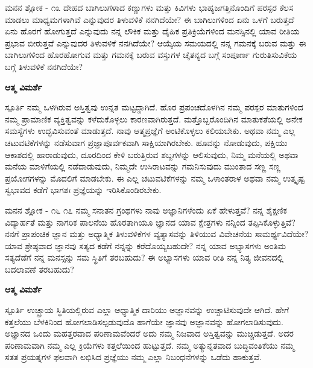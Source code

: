 \newpage
\begin{mananam}{\mananamfont \large ಮನನ ಶ್ಲೋಕ - ೧೩}
\mananamtext ದೇಹದ ಬಾಗಿಲುಗಳಾದ ಕಣ್ಣುಗಳು ಮತ್ತು ಕಿವಿಗಳು  ಭಾಹ್ಯಜಗತ್ತಿನೊಂದಿಗೆ ಪರಸ್ಪರ ಕೆಲಸ ಮಾಡಲು ಮಾಧ್ಯಮಗಳಾಗಿವೆ ಎನ್ನುವುದರ ತಿಳುವಳಿಕೆ  ನನಗಿದೆಯೇ? ಈ ಬಾಗಿಲುಗಳಿಂದ ಏನು ಒಳಗೆ ಬರುತ್ತದೆ ಏನು ಹೊರಗೆ ಹೋಗುತ್ತದೆ ಎನ್ನುವುದು ನನ್ನ ಲೌಕಿಕ ಮತ್ತು ದೈಹಿಕ ಪ್ರತಿಕ್ರಿಯೆಗಳಿಂದ ಮನಸ್ಸಿನಲ್ಲಿ ಯಾವ ರೀತಿಯ ಪ್ರಭಾವ ಬೀರುತ್ತವೆ ಎನ್ನುವುದರ ತಿಳುವಳಿಕೆ ನನಗಿದೆಯೇ? ಆಯ್ಕೆಯ ಸಮಯದಲ್ಲಿ ನನ್ನ ಗಮನಕ್ಕೆ ಬರುವ ಮತ್ತು ಈ ಬಾಗಿಲುಗಳಿಂದ ಹೊರಹೋಗುವ ಮತ್ತು ಗಮನಕ್ಕೆ ಬರುವ ವಸ್ತುಗಳ ಚೈತನ್ಯದ ಬಗ್ಗೆ ಸಂಪೂರ್ಣ ಗುರುತಿಸುವಿಕೆಯ ಬಗ್ಗೆ ತಿಳುವಳಿಕೆ ನನಗಿದೆಯೇ?
\end{mananam}
\WritingHand\enspace\textbf{ಆತ್ಮ ವಿಮರ್ಶೆ}\\
\begin{inspiration}{\mananamfont \large ಸ್ಪೂರ್ತಿ}
\ssmall \mananamtext ನಮ್ಮ ಒಳಗಿರುವ ಅಸ್ತಿತ್ವವು ಉನ್ನತ ಮಟ್ಟದ್ದಾಗಿದೆ. ಹೊರ ಪ್ರಪಂಚದೊಳಗಿನ ನಮ್ಮ ಪರಸ್ಪರ ಮಾತುಗಳಿಂದ ನಮ್ಮ ಪ್ರಾಮಾಣಿಕ ವ್ಯಕ್ತಿತ್ವವನ್ನು ಕಳೆದುಕೊಳ್ಳಲು ಕಾರಣವಾಗಿರುತ್ತದೆ. ಮತ್ತೊಬ್ಬರೊಂದಿಗಿನ ಮಾತುಕತೆಯಲ್ಲಿ ಅನೇಕ ಸಮಸ್ಯೆಗಳು ಉದ್ಭವಿಸುವಂತೆ ಮಾಡುತ್ತದೆ. ನಾವು ಆತ್ಮಪ್ರಜ್ಞೆಗೆ ಅಂಟಿಕೊಳ್ಳಲು ಕಲಿಯಬೇಕು. ಅಥವಾ ನಮ್ಮ ಎಲ್ಲ ಚಟುವಟಿಕೆಗಳನ್ನು ನಡೆಸುವಾಗ ಪ್ರಜ್ಞಾಪೂರ್ವಕವಾಗಿ   ಸಾಕ್ಷಿಯಾಗಿರಬೇಕು. ಹೂವನ್ನು ನೋಡುವುದು, ಪಕ್ಷಿಯು ಆಕಾಶದಲ್ಲಿ ಹಾರಾಡುವುದು, ದೂರದಿಂದ ಕೇಳಿ ಬರುತ್ತಿರುವ ಶಬ್ದಗಳನ್ನು ಆಲಿಸುವುದು, ನಿಮ್ಮ ಮನೆಯಲ್ಲಿ ಅಥವಾ ಮನೆಯ ಮಾಳಿಗೆಯಲ್ಲಿ ನಡೆದಾಡುವುದು, ನಿಮ್ಮದೇ ಉಸಿರಾಟವನ್ನು ಗಮನಿಸುವುದು ಮುಂತಾದ ಸಣ್ಣ ಸಣ್ಣ ಪ್ರಯೋಗಗಳನ್ನು ಮೊದಲಿಗೆ ಮಾಡಬೇಕು. ಈ ಎಲ್ಲ ಚಟುವಟಿಕೆಗಳನ್ನು ನಮ್ಮ ಒಳಾಂತರಾಳ ಅಥವಾ ನಮ್ಮ ಉತ್ಕೃಷ್ಟ ಸ್ವಭಾವದ ಕಡೆಗೆ ಭಾಗಶಃ ಪ್ರಜ್ಞೆಯನ್ನು ಇರಿಸಿಕೊಂಡಿರಬೇಕು.
\end{inspiration}
\newpage

\begin{mananam}{\mananamfont \large ಮನನ ಶ್ಲೋಕ - ೧೬ ೧೭}
\mananamtext ನಮ್ಮ ಸನಾತನ ಗ್ರಂಥಗಳು ನಾವು ಅಜ್ಞಾನಿಗಳೆಂದು ಏಕೆ ಹೇಳುತ್ತವೆ? ನನ್ನ ಶೈಕ್ಷಣಿಕ ವಿದ್ಯಾರ್ಹತೆ ಮತ್ತು ನಾಗರಿಕ ಪಾಲನೆಯ ಹೊರತಾಗಿಯೂ ಜ್ಞಾನದ ಯಾವ ಕ್ಷೇತ್ರಗಳು ನನ್ನಿಂದ ತಪ್ಪಿಸಿಕೊಳ್ಳುತ್ತಿವೆ? ನನಗೆ ಪ್ರಾಪಂಚಿಕ ಜ್ಞಾನ ಮತ್ತು ಅಧ್ಯಾತ್ಮಿಕ ತಿಳುವಳಿಕೆಗಳ ವ್ಯತ್ಯಾಸವನ್ನು ತಿಳಿಯುವ ವಿವೇಚನೆಯ ಸಾಮರ್ಥ್ಯವಿದೆಯೇ? ಯಾವ ಶ್ರೇಷ್ಠವಾದ  ಜ್ಞಾನವು  ಸತ್ಯದ ಕಡೆಗೆ ನನ್ನನ್ನು ಕರೆದೊಯ್ಯಬಹುದೇ? ನನ್ನ ಯಾವ ಅಭ್ಯಾಸಗಳು ಅಂತಿಮ ಸತ್ಯದೆಡೆಗೆ ನನ್ನ ಮನಸ್ಸನ್ನು ಸಮ ಸ್ಥಿತಿಗೆ ತರಬಹುದು? ಈ ಅಭ್ಯಾಸಗಳು ಯಾವ ರೀತಿ ನನ್ನ ನಿತ್ಯ ಜೀವನದಲ್ಲಿ ಬದಲಾವಣೆ ತರಬಹುದು?
\end{mananam}
\WritingHand\enspace\textbf{ಆತ್ಮ ವಿಮರ್ಶೆ}\\
\begin{inspiration}{\mananamfont \large ಸ್ಪೂರ್ತಿ}
\mananamtext ಉಚ್ಛ್ರಾಯ   ಸ್ಥಿತಿಯಲ್ಲಿರುವ ಎಲ್ಲಾ ಆಧ್ಯಾತ್ಮಿಕ ದಾರಿಯು ಅಜ್ಞಾನವನ್ನು ಉಚ್ಚಾಟಿಸುವುದೇ   ಆಗಿದೆ. ಹೇಗೆ ಕತ್ತಲೆಯು ಬೆಳಕಿನಿಂದ ಹೋಗಲಾಡಿಸಲ್ಪಡುವುದೊ   ಹಾಗೆಯೇ ಜ್ಞಾನವು ಅಜ್ಞಾನವನ್ನು ಹೋಗಲಾಡಿಸುವುದು. ಅಜ್ಞಾನದ ಒಂದು ಮಹತ್ತರವಾದ ಪರಿಣಾಮವೆಂದರೆ ಅದು ನಮ್ಮ ನಿಜವಾದ ಅಸ್ತಿತ್ವವನ್ನು ಮುಚ್ಚಿಡುತ್ತದೆ. ಅದರ ಪರಿಣಾಮವಾಗಿ ನಮ್ಮ ಎಲ್ಲ ಕ್ರಿಯೆಗಳು ಕತ್ತಲೆಯಿಂದ ಹುಟ್ಟುತ್ತದೆ. ನಮ್ಮ ಅತ್ಯುನ್ನತವಾದ ಬುದ್ಧಿವಂತಿಕೆಯು ನಮ್ಮ ಸತತ ಪ್ರಯತ್ನಗಳ ಫಲವಾಗಿ ಲಭಿಸಿದ ಪ್ರಜ್ಞೆಯು ನಮ್ಮ ಎಲ್ಲಾ ನಿಬಂಧನೆಗಳನ್ನು ಒಡೆದು ಹಾಕುತ್ತವೆ.
\end{inspiration}
\newpage

